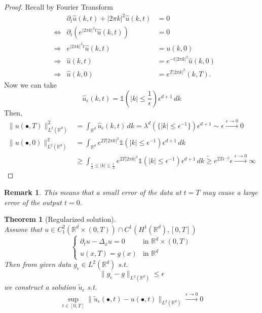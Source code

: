 \documentclass{report}
\theoremstyle{tommy}
\newtheorem{thm}[defn]{Theorem}
\newtheorem{rem}[defn]{Remark}
\begin{document}
	\begin{proof}
		Recall by Fourier Transform 
		\begin{align*}
			&&\partial_t \hat u (k,t) + |2 \pi k|^2 \hat u(k,t) &= 0\\ 
			&\Leftrightarrow&\partial_t (e^{|2 \pi k|^2t} \hat u(k,t)) &= 0 \\
			&\Rightarrow&e^{|2 \pi k|^2t} \hat u(k,t) &= u(k,0) \\
			&\Rightarrow&\hat u(k,t) &= e^{-t |2 \pi k|^2} \hat u(k,0) \\
			&\Rightarrow&\hat u(k,0) &= e^{T |2 \pi k|^2} (k,T).
		\end{align*}
		Now we can take
		\[\hat u_\epsilon(k,t) = \mathbb{1}\left(|k| \le \frac{1}{\epsilon}\right) \epsilon^{d+1} \, dk\]
		Then,
		\begin{align*}
			\|u(\bullet, T)\|_{L^2(\mathbb{R}^d)}^2 &= \int_{\mathbb{R}^d} \hat u_\epsilon(k,t) \,dk = \lambda^d(\{|k| \le \epsilon^{-1}\})\epsilon^{d+1} \sim \epsilon \xrightarrow{\epsilon \to 0} 0 \\
			\|u(\bullet, 0)\|_{L^2(\mathbb{R}^d)}^2 &= \int_{\mathbb{R}^d} e^{2T |2 \pi k|^2} \mathbb{1}(|k|\le \epsilon^{-1})\epsilon^{d+1} \, dk \\
			&\ge \int_{\frac{\epsilon}{2} \le |k| \le \frac{\epsilon}{2}} e^{2T |2 \pi k|^2}\mathbb{1}(|k|\le \epsilon^{-1})\epsilon^{d+1} \, dk
			\tilde \ge e^{2T\epsilon^{-2}}\epsilon \xrightarrow{\epsilon \to 0} \infty
		\end{align*}
	\end{proof}

	\begin{rem}
		This means that a small error of the data at \(t=T\) may cause a large error of the output \(t= 0\).
	\end{rem}

	\begin{thm}[Regularized solution]\ \\
		Assume that \(u \in C_1^2(\mathbb{R}^d \times (0,T)) \cap C^1(H^1(\mathbb{R}^d), [0,T])\)
		\[\begin{cases}
			\partial_t u - \Delta_x u = 0 &\text{in } \mathbb{R}^d \times (0,T) \\
			u(x,T) = g(x) &\text{in } \mathbb{R}^d
		\end{cases}\]
		Then from given data \(g_\epsilon \in L^2(\mathbb{R}^d)\) s.t. 
		\[\|g_\epsilon - g\|_{L^2(\mathbb{R}^d)} \le \epsilon\]
		we construct a solution \(\tilde u_\epsilon\) s.t.
		\[\sup_{t \in [0,T]}\|\tilde u_\epsilon(\bullet, t) - u(\bullet, t)\|_{L^2(\mathbb{R}^d)} \xrightarrow{\epsilon \to 0} 0\]
	\end{thm}
\end{document}
